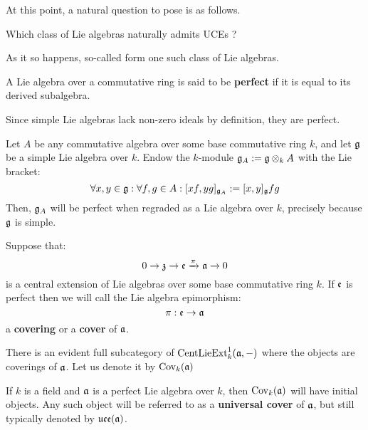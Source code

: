         At this point, a natural question to pose is as follows.
        \begin{question}
            Which class of Lie algebras naturally admits UCEs ? 
        \end{question}
        As it so happens, so-called  form one such class of Lie algebras.
        \begin{definition}
            A Lie algebra over a commutative ring is said to be \textbf{perfect} if it is equal to its derived subalgebra. 
        \end{definition}
        \begin{example}
            Since simple Lie algebras lack non-zero ideals by definition, they are perfect. 
        \end{example}
        \begin{example}
            Let $A$ be any commutative algebra over some base commutative ring $k$, and let $\mathfrak{g}$ be a simple Lie algebra over $k$. Endow the $k$-module $\g_A := \g \tensor_k A$ with the Lie bracket:
                $$\forall x, y \in \mathfrak{g}: \forall f, g \in A: [x f, y g]_{\mathfrak{g}_A} := [x, y]_{\mathfrak{g}} fg$$
            Then, $\mathfrak{g}_A$ will be perfect when regraded as a Lie algebra over $k$, precisely because $\mathfrak{g}$ is simple.
        \end{example}
        \begin{definition}
            Suppose that:
                $$0 \to \mathfrak{z} \to \mathfrak{e} \xrightarrow[]{\pi} \mathfrak{a} \to 0$$
            is a central extension of Lie algebras over some base commutative ring $k$. If $\mathfrak{e}$ is perfect then we will call the Lie algebra epimorphism:
                $$\pi: \mathfrak{e} \to \mathfrak{a}$$
            a \textbf{covering} or a \textbf{cover} of $\mathfrak{a}$. 

            There is an evident full subcategory of $\mathrm{Cent}\mathrm{Lie}\mathrm{Ext}^1_k(\mathfrak{a}, -)$ where the objects are coverings of $\mathfrak{a}$. Let us denote it by $\mathrm{Cov}_k(\mathfrak{a})$
        \end{definition}
        \begin{proposition} \label{prop: perfect_lie_algebras_admit_UCEs}
            \cite[Lemma 1.10]{garland_arithmetics_of_loop_groups} If $k$ is a field and $\mathfrak{a}$ is a perfect Lie algebra over $k$, then $\mathrm{Cov}_k(\mathfrak{a})$ will have initial objects. Any such object will be referred to as a \textbf{universal cover} of $\mathfrak{a}$, but still typically denoted by $\mathfrak{uce}(\mathfrak{a})$.
        \end{proposition}
